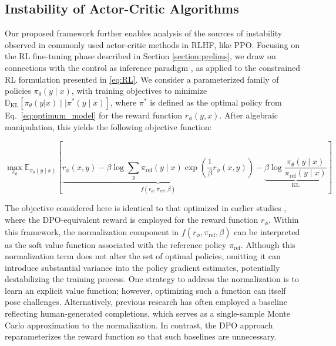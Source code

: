 \subsection{Instability of Actor-Critic Algorithms} Our proposed framework further enables analysis of the sources of instability observed in commonly used actor-critic methods in RLHF, like PPO. Focusing on the RL fine-tuning phase described in Section \ref{section:prelims}, we draw on connections with the control as inference paradigm \cite{levine2018reinforcement}, as applied to the constrained RL formulation presented in \ref{eq:RL}. We consider a parameterized family of policies $\pi_{\theta}(y\mid x)$, with training objectives to minimize $\mathbb{D}_{\text{KL}}[\pi_{\theta}(y|x) \mid \mid \pi^*(y\mid x)]$, where $\pi^*$ is defined as the optimal policy from Eq.~\ref{eq:optimum_model} for the reward function $r_{\phi}(y, x)$. After algebraic manipulation, this yields the following objective function:

\begin{equation}\label{eq:AC}
    \max_{\pi_{\theta}}\mathbb{E}_{\pi_{\theta}(y\mid x)}\left[\underbrace{r_{\phi}(x, y) -\beta\log\sum_{y}\pi_\text{ref}(y\mid x)\exp\left(\frac{1}{\beta}r_{\phi}(x, y)\right)}_{f(r_{\phi}, \pi_\text{ref}, \beta)} - \underbrace{\beta\log\frac{\pi_{\theta}(y\mid x)}{\pi_\text{ref}(y\mid x)}}_{\text{KL}}\right]
\end{equation}

The objective considered here is identical to that optimized in earlier studies 
\citep{ziegler2020finetuning, stiennon2022learning, bai2022training, ouyang2022training}, where the DPO-equivalent reward is employed for the reward function $r_{\phi}$. Within this framework, the normalization component in $f(r_{\phi}, \pi_\text{ref}, \beta)$ can be interpreted as the soft value function associated with the reference policy $\pi_\text{ref}$. Although this normalization term does not alter the set of optimal policies, omitting it can introduce substantial variance into the policy gradient estimates, potentially destabilizing the training process. One strategy to address the normalization is to learn an explicit value function; however, optimizing such a function can itself pose challenges. Alternatively, previous research has often employed a baseline reflecting human-generated completions, which serves as a single-sample Monte Carlo approximation to the normalization. In contrast, the DPO approach reparameterizes the reward function so that such baselines are unnecessary.

